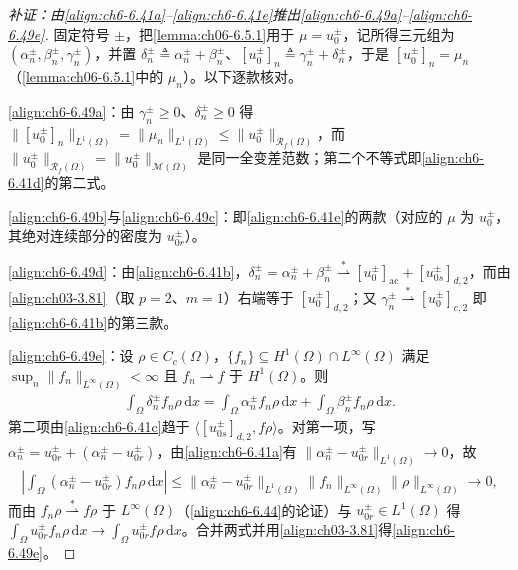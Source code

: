 \documentclass[../../main.tex]{subfiles}%
\begin{document}
\begin{proof}[补证：由\eqref{align:ch6-6.41a}--\eqref{align:ch6-6.41e}推出\eqref{align:ch6-6.49a}--\eqref{align:ch6-6.49e}]
固定符号 $\pm$，把\cref{lemma:ch06-6.5.1}用于 $\mu=u^\pm_0$，记所得三元组为 $(\alpha^\pm_n,\beta^\pm_n,\gamma^\pm_n)$，并置 $\delta^\pm_n\triangleq\alpha^\pm_n+\beta^\pm_n$、$[u^\pm_0]_n\triangleq\gamma^\pm_n+\delta^\pm_n$，于是 $[u^\pm_0]_n=\mu_n$（\cref{lemma:ch06-6.5.1}中的 $\mu_n$）。以下逐款核对。

\eqref{align:ch6-6.49a}：由 $\gamma^\pm_n\geqslant0$、$\delta^\pm_n\geqslant0$ 得 $\|[u^\pm_0]_n\|_{L^1(\Omega)}=\|\mu_n\|_{L^1(\Omega)}\leqslant\|u^\pm_0\|_{\mathscr{R}_f(\Omega)}$，而 $\|u^\pm_0\|_{\mathscr{R}_f(\Omega)}=\|u^\pm_0\|_{\mathscr{M}(\Omega)}$ 是同一全变差范数；第二个不等式即\eqref{align:ch6-6.41d}的第二式。

\eqref{align:ch6-6.49b}与\eqref{align:ch6-6.49c}：即\eqref{align:ch6-6.41e}的两款（对应的 $\mu$ 为 $u^\pm_0$，其绝对连续部分的密度为 $u^\pm_{0r}$）。

\eqref{align:ch6-6.49d}：由\eqref{align:ch6-6.41b}，$\delta^\pm_n=\alpha^\pm_n+\beta^\pm_n\stackrel{*}{\rightharpoonup}[u^\pm_0]_{\mathrm{ac}}+[u^\pm_{0s}]_{d,2}$，而由\eqref{align:ch03-3.81}（取 $p=2$、$m=1$）右端等于 $[u^\pm_0]_{d,2}$；又 $\gamma^\pm_n\stackrel{*}{\rightharpoonup}[u^\pm_0]_{c,2}$ 即\eqref{align:ch6-6.41b}的第三款。

\eqref{align:ch6-6.49e}：设 $\rho\in C_c(\Omega)$，$\{f_n\}\subseteq H^1(\Omega)\cap L^\infty(\Omega)$ 满足 $\sup_n\|f_n\|_{L^\infty(\Omega)}<\infty$ 且 $f_n\rightharpoonup f$ 于 $H^1(\Omega)$。则
\begin{align*}
\int_\Omega\delta^\pm_nf_n\rho\,\mathrm{d}x
=\int_\Omega\alpha^\pm_nf_n\rho\,\mathrm{d}x+\int_\Omega\beta^\pm_nf_n\rho\,\mathrm{d}x.
\end{align*}
第二项由\eqref{align:ch6-6.41c}趋于 $\langle[u^\pm_{0s}]_{d,2},f\rho\rangle$。对第一项，写 $\alpha^\pm_n=u^\pm_{0r}+(\alpha^\pm_n-u^\pm_{0r})$，由\eqref{align:ch6-6.41a}有 $\|\alpha^\pm_n-u^\pm_{0r}\|_{L^1(\Omega)}\to0$，故
\begin{align*}
\left|\int_\Omega(\alpha^\pm_n-u^\pm_{0r})f_n\rho\,\mathrm{d}x\right|
\leqslant\|\alpha^\pm_n-u^\pm_{0r}\|_{L^1(\Omega)}\|f_n\|_{L^\infty(\Omega)}\|\rho\|_{L^\infty(\Omega)}\to0,
\end{align*}
而由 $f_n\rho\stackrel{*}{\rightharpoonup}f\rho$ 于 $L^\infty(\Omega)$（\eqref{align:ch6-6.44}的论证）与 $u^\pm_{0r}\in L^1(\Omega)$ 得 $\int_\Omega u^\pm_{0r}f_n\rho\,\mathrm{d}x\to\int_\Omega u^\pm_{0r}f\rho\,\mathrm{d}x$。合并两式并用\eqref{align:ch03-3.81}得\eqref{align:ch6-6.49e}。
\end{proof}
\end{document}
